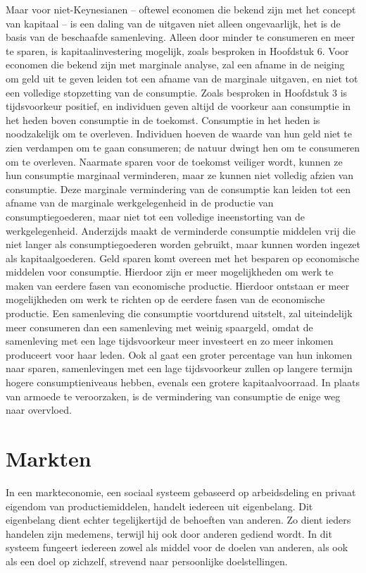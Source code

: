 \documentclass[
  a5paper,
  smalldemyvopaper,11pt,twoside,onecolumn,openright,extrafontsizes,
hidelinks]{memoir}
\begin{document}
Maar voor niet-Keynesianen -- oftewel economen die bekend zijn met het
concept van kapitaal -- is een daling van de uitgaven niet alleen
ongevaarlijk, het is de basis van de beschaafde samenleving. Alleen door
minder te consumeren en meer te sparen, is kapitaalinvestering mogelijk,
zoals besproken in Hoofdstuk 6. Voor economen die bekend zijn met
marginale analyse, zal een afname in de neiging om geld uit te geven
leiden tot een afname van de marginale uitgaven, en niet tot een
volledige stopzetting van de consumptie. Zoals besproken in Hoofdstuk 3
is tijdsvoorkeur positief, en individuen geven altijd de voorkeur aan
consumptie in het heden boven consumptie in de toekomst. Consumptie in
het heden is noodzakelijk om te overleven. Individuen hoeven de waarde
van hun geld niet te zien verdampen om te gaan consumeren; de natuur
dwingt hen om te consumeren om te overleven. Naarmate sparen voor de
toekomst veiliger wordt, kunnen ze hun consumptie marginaal verminderen,
maar ze kunnen niet volledig afzien van consumptie. Deze marginale
vermindering van de consumptie kan leiden tot een afname van de
marginale werkgelegenheid in de productie van consumptiegoederen, maar
niet tot een volledige ineenstorting van de werkgelegenheid. Anderzijds
maakt de verminderde consumptie middelen vrij die niet langer als
consumptiegoederen worden gebruikt, maar kunnen worden ingezet als
kapitaalgoederen. Geld sparen komt overeen met het besparen op
economische middelen voor consumptie. Hierdoor zijn er meer
mogelijkheden om werk te maken van eerdere fasen van economische
productie. Hierdoor ontstaan er meer mogelijkheden om werk te richten op
de eerdere fasen van de economische productie. Een samenleving die
consumptie voortdurend uitstelt, zal uiteindelijk meer consumeren dan
een samenleving met weinig spaargeld, omdat de samenleving met een lage
tijdsvoorkeur meer investeert en zo meer inkomen produceert voor haar
leden. Ook al gaat een groter percentage van hun inkomen naar sparen,
samenlevingen met een lage tijdsvoorkeur zullen op langere termijn
hogere consumptieniveaus hebben, evenals een grotere kapitaalvoorraad.
In plaats van armoede te veroorzaken, is de vermindering van consumptie
de enige weg naar overvloed.

\chapter{Markten}\label{sec-markten}

In een markteconomie, een sociaal systeem gebaseerd op arbeidsdeling en
privaat eigendom van productiemiddelen, handelt iedereen uit
eigenbelang. Dit eigenbelang dient echter tegelijkertijd de behoeften
van anderen. Zo dient ieders handelen zijn medemens, terwijl hij ook
door anderen gediend wordt. In dit systeem fungeert iedereen zowel als
middel voor de doelen van anderen, als ook als een doel op zichzelf,
strevend naar persoonlijke doelstellingen.
\end{document}
